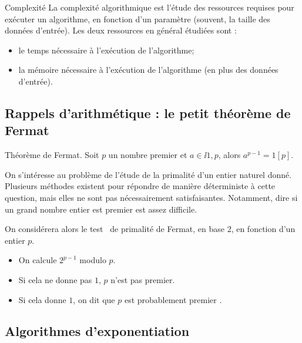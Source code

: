 \begin{defi}{Complexité}
  La complexité algorithmique est l'étude des ressources requises pour exécuter un algorithme, en fonction d'un paramètre (souvent, la taille des données d'entrée). Les deux ressources en général étudiées sont :
\begin{itemize}
\item le temps nécessaire à l'exécution de l'algorithme;
\item la mémoire nécessaire à l'exécution de l'algorithme (en plus des données d'entrée).
\end{itemize}
\end{defi}


%

\subsection{Rappels d'arithmétique : le petit théorème de Fermat}

\begin{theorem}{Théorème de Fermat.}
  Soit $p$ un nombre premier et $a \in \ii{1,p}$, alors $a^{p-1} = 1 [p]$.
\end{theorem}

On s'intéresse au problème de l'étude de la primalité d'un entier naturel donné. 
Plusieurs méthodes existent pour répondre de manière déterministe à cette question, mais elles ne sont pas nécessairement satisfaisantes. 
Notamment, dire si un grand nombre entier est premier est assez difficile. 

On considérera alors le \og test \fg\ de primalité de Fermat, en base 2, en fonction d'un entier $p$.
\begin{itemize}
  \item On calcule $2^{p-1}$ modulo $p$. 
  \item Si cela ne donne pas $1$, $p$ n'est pas premier. 
  \item Si cela donne $1$, on dit que \og $p$ est probablement premier \fg.
\end{itemize}

\subsection{Algorithmes d'exponentiation}

